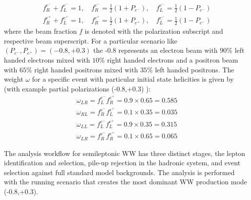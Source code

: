  \begin{equation}
 \begin{split}
f_R^{e^-} + f_L^{e^-} = 1 ,\, \, \, \, \, \, f_R^{e^-} = \frac{1}{2}(1 + P_{e^-}) ,\, \, \, \, \, \, f_L^{e^-}=\frac{1}{2}(1- P_{e^-}) \\
f_R^{e^+} + f_L^{e^+} = 1 ,\, \, \, \, \, \, f_R^{e^+} = \frac{1}{2}(1 + P_{e^+}) , \, \, \, \, \, \, f_L^{e^-}=\frac{1}{2}(1- P_{e^-})
\end{split}
 \end{equation}
where the beam fraction $f$ is denoted with the polarization subscript and respective beam superscript. For a particular scenario like $(P_{e^-}, P_{e^+}) = (-0.8, +0.3)$ the -0.8 represents an electron beam with $90\% $ left handed electrons mixed with $10\% $ right handed electrons and a positron beam with $65\%$ right handed positrons mixed with $35\%$ left handed positrons. The weight $\omega$ for a specific event with particular initial state helicities is given by (with example partial polarizations (-0.8,+0.3) ):
 \begin{equation}
 \begin{split} 
 \omega_{LR} = f_L^{e^-}f_R^{e^+} = 0.9 \times 0.65 = 0.585 \\
 \omega_{RL} = f_R^{e^-}f_L^{e^+} = 0.1 \times 0.35 = 0.035 \\
 \omega_{LL} = f_L^{e^-}f_L^{e^+} = 0.9 \times 0.35 = 0.315 \\
 \omega_{LR} = f_R^{e^-}f_R^{e^+} = 0.1 \times 0.65 = 0.065 
 \end{split}
 \end{equation} 

The analysis workflow for semileptonic WW has three distinct stages, the lepton identification and selection, pile-up rejection in the hadronic system, and event selection against full standard model backgrounds. The analysis is performed with the  running scenario that creates the most dominant WW production mode (-0.8,+0.3). 


